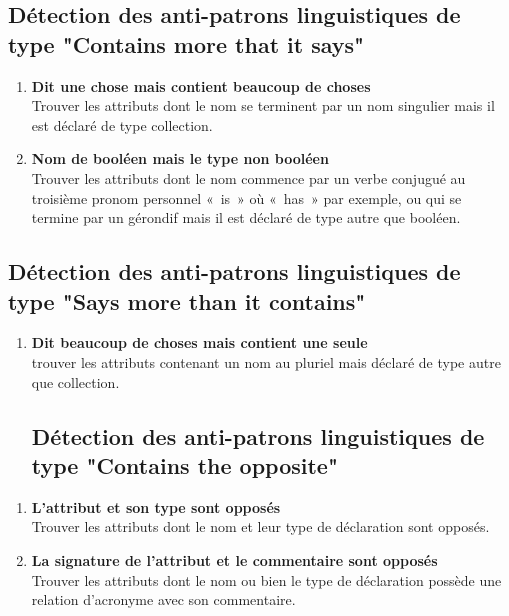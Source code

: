 \subsection{Détection des anti-patrons linguistiques de type "Contains more that it says"}
\begin{enumerate}
    \item \textbf{Dit une chose mais contient beaucoup de choses}\\
    Trouver les attributs dont le nom se terminent par un nom singulier mais il est déclaré de type collection.
\item \textbf{Nom de booléen mais le type non booléen}\\
Trouver les attributs dont le nom  commence par  un verbe conjugué au troisième pronom personnel « is » où « has » par exemple, ou qui se termine par un gérondif mais il est déclaré de type autre que booléen.
\end{enumerate}
\subsection{Détection des anti-patrons linguistiques de type "Says more than it contains"}
\begin{enumerate}
    

\item \textbf{Dit beaucoup de choses mais contient une seule}\\
trouver les attributs contenant un nom au pluriel mais déclaré de type autre que collection.
\subsection{Détection des anti-patrons linguistiques de type "Contains the opposite"}
\end{enumerate}
\begin{enumerate}
    

\item \textbf{L'attribut et son type sont opposés}\\
Trouver les attributs dont le nom et leur type de déclaration sont opposés.
\item \textbf{ La signature de l’attribut et le commentaire sont opposés}
\\Trouver les attributs dont le nom ou bien le type de déclaration possède une relation d’acronyme avec son commentaire.
\end{enumerate}

